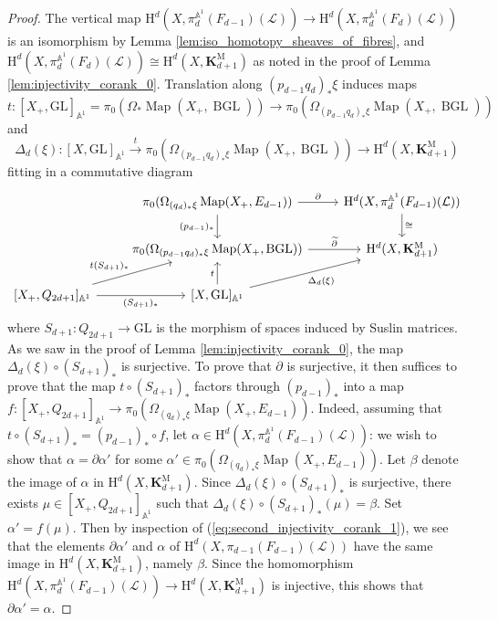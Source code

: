 \documentclass[11pt,leqno]{amsart}
\newcommand{\GL}{{\mathrm{GL}}}
\renewcommand{\1}{{\rm 1\hspace*{-0.4ex}%
\rule{0.1ex}{1.52ex}\hspace*{0.2ex}}}
\renewcommand{\Lc}{{\mathcal L}}
\newcommand{\Hr}{{\mathrm {H}}}
\newcommand{\<}[1]{{\langle}#1 {\rangle}}
\newcommand{\Kbf}{\mathbf{K}}
\newcommand{\Abb}{\mathbb{A}}
\newcommand{\BGL}{\operatorname{BGL}}
\newcommand{\Mr}{\mathrm{M}}
\newcommand{\Map}{\operatorname{Map}}
\theoremstyle{plain}
\theoremstyle{definition}
\theoremstyle{remark}
\numberwithin{equation}{section}
\begin{document}
\begin{proof}
The vertical map $\Hr^d(X,\pi_d^{\Abb^1}(F_{d-1})(\Lc))\to\Hr^d(X,\pi_d^{\Abb^1}(F_{d})(\Lc))$ is an isomorphism by Lemma \ref{lem:iso_homotopy_sheaves_of_fibres}, and $\Hr^d(X,\pi_d^{\Abb^1}(F_{d})(\Lc))\cong\Hr^d(X,\Kbf_{d+1}^\Mr)$ as noted in the proof of Lemma \ref{lem:injectivity_corank_0}. Translation along $(p_{d-1}q_d)_*\xi$ induces maps \[t:[X_+,\GL]_{\Abb^1}=\pi_0(\Omega_*\Map(X_+,\BGL))\to\pi_0(\Omega_{(p_{d-1}q_d)_*\xi}\Map(X_+,\BGL))\] and \[\Delta_d(\xi):[X,\GL]_{\Abb^1}\xrightarrow{t}\pi_0(\Omega_{(p_{d-1}q_d)_*\xi}\Map(X_+,\BGL))\to\Hr^d(X,\Kbf_{d+1}^\Mr)\] fitting in a commutative diagram
\begin{equation}\label{eq:second_injectivity_corank_1}
\begin{tikzcd}
& \pi_0(\Omega_{(q_d)_*\xi}\Map(X_+,E_{d-1})) \arrow[r,"\partial"] \arrow[d,swap,"\protect{(p_{d-1})_*}"] &  \Hr^d(X,\pi_{d}^{\Abb^1}(F_{d-1})(\Lc)) \arrow[d,"\cong"] \\
& \pi_0(\Omega_{(p_{d-1}q_d)_*\xi}\Map(X_+,\BGL)) \arrow[r,"\widetilde{\partial}"] & \Hr^d(X,\Kbf_{d+1}^\Mr) \\
\protect{[X_+,Q_{2d+1}]_{\Abb^1}} \arrow[r,swap,"(S_{d+1})_*"] \arrow[ru,"\protect{t(S_{d+1})_*}"] & \protect{[X,\GL]_{\Abb^1}} \arrow[u,"t"] \arrow[ru,swap,"\protect{\Delta_d(\xi)}"] & 
\end{tikzcd}
\end{equation}
where $S_{d+1}:Q_{2d+1}\to\GL$ is the morphism of spaces induced by Suslin matrices. As we saw in the proof of Lemma \ref{lem:injectivity_corank_0}, the map $\Delta_d(\xi)\circ(S_{d+1})_*$ is surjective. To prove that $\partial$ is surjective, it then suffices to prove that the map $t\circ(S_{d+1})_*$ factors through $(p_{d-1})_*$ into a map $f:[X_+,Q_{2d+1}]_{\Abb^1}\to\pi_0(\Omega_{(q_d)_*\xi}\Map(X_+,E_{d-1}))$. Indeed, assuming that $t\circ(S_{d+1})_*=(p_{d-1})_*\circ f$, let $\alpha\in\Hr^d(X,\pi_d^{\Abb^1}(F_{d-1})(\Lc))$: we wish to show that $\alpha=\partial\alpha'$ for some $\alpha'\in\pi_0(\Omega_{(q_d)_*\xi}\Map(X_+,E_{d-1}))$. Let $\beta$ denote the image of $\alpha$ in $\Hr^d(X,\Kbf_{d+1}^\Mr)$. Since $\Delta_d(\xi)\circ(S_{d+1})_*$ is surjective, there exists $\mu\in[X_+,Q_{2d+1}]_{\Abb^1}$ such that $\Delta_d(\xi)\circ(S_{d+1})_*(\mu)=\beta$. Set $\alpha'=f(\mu)$. Then by inspection of (\ref{eq:second_injectivity_corank_1}), we see that the elements $\partial\alpha'$ and $\alpha$ of $\Hr^d(X,\pi_{d-1}(F_{d-1})(\Lc))$ have the same image in $\Hr^d(X,\Kbf_{d+1}^\Mr)$, namely $\beta$. Since the homomorphism $\Hr^d(X,\pi_{d}^{\Abb^1}(F_{d-1})(\Lc))\to\Hr^d(X,\Kbf_{d+1}^\Mr)$ is injective, this shows that $\partial\alpha'=\alpha$.


\end{proof}
\end{document}

